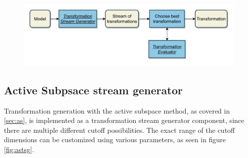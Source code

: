 \documentclass[
  a4paper,  %
  twoside,  %
  bibliography=totoc,
  headsepline,
  cleardoublepage=empty,
  parskip=half,
  draft=false
]{scrbook}
\begin{document}
\begin{mdframed}[style=style,frametitle={Transformation generator (stream-based)}]
\begin{figure}[H]
\includegraphics[width=\textwidth]{graphics/TransformationGen_Stream.pdf}
\delimit
{}
\label{fig:tsg}
\end{figure}
\end{mdframed}

\subsection{Active Subpsace stream generator}

Transformation generation with the active subspace method, as covered in \cref{sec:as}, is implemented as a transformation stream generator component, since there are multiple different cutoff possibilities.
The exact range of the cutoff dimensions can be customized using various parameters, as seen in figure \cref{fig:astsg}.

\newpage
\end{document}

